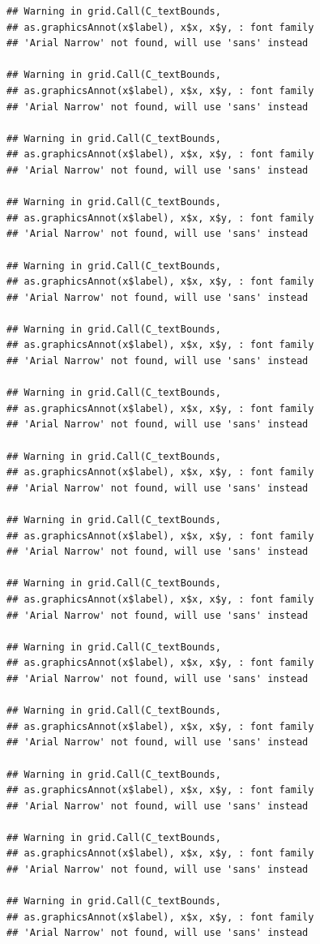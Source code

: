 \documentclass[]{krantz}
\begin{document}
\begin{verbatim}
## Warning in grid.Call(C_textBounds,
## as.graphicsAnnot(x$label), x$x, x$y, : font family
## 'Arial Narrow' not found, will use 'sans' instead

## Warning in grid.Call(C_textBounds,
## as.graphicsAnnot(x$label), x$x, x$y, : font family
## 'Arial Narrow' not found, will use 'sans' instead

## Warning in grid.Call(C_textBounds,
## as.graphicsAnnot(x$label), x$x, x$y, : font family
## 'Arial Narrow' not found, will use 'sans' instead

## Warning in grid.Call(C_textBounds,
## as.graphicsAnnot(x$label), x$x, x$y, : font family
## 'Arial Narrow' not found, will use 'sans' instead

## Warning in grid.Call(C_textBounds,
## as.graphicsAnnot(x$label), x$x, x$y, : font family
## 'Arial Narrow' not found, will use 'sans' instead

## Warning in grid.Call(C_textBounds,
## as.graphicsAnnot(x$label), x$x, x$y, : font family
## 'Arial Narrow' not found, will use 'sans' instead

## Warning in grid.Call(C_textBounds,
## as.graphicsAnnot(x$label), x$x, x$y, : font family
## 'Arial Narrow' not found, will use 'sans' instead

## Warning in grid.Call(C_textBounds,
## as.graphicsAnnot(x$label), x$x, x$y, : font family
## 'Arial Narrow' not found, will use 'sans' instead

## Warning in grid.Call(C_textBounds,
## as.graphicsAnnot(x$label), x$x, x$y, : font family
## 'Arial Narrow' not found, will use 'sans' instead

## Warning in grid.Call(C_textBounds,
## as.graphicsAnnot(x$label), x$x, x$y, : font family
## 'Arial Narrow' not found, will use 'sans' instead

## Warning in grid.Call(C_textBounds,
## as.graphicsAnnot(x$label), x$x, x$y, : font family
## 'Arial Narrow' not found, will use 'sans' instead

## Warning in grid.Call(C_textBounds,
## as.graphicsAnnot(x$label), x$x, x$y, : font family
## 'Arial Narrow' not found, will use 'sans' instead

## Warning in grid.Call(C_textBounds,
## as.graphicsAnnot(x$label), x$x, x$y, : font family
## 'Arial Narrow' not found, will use 'sans' instead

## Warning in grid.Call(C_textBounds,
## as.graphicsAnnot(x$label), x$x, x$y, : font family
## 'Arial Narrow' not found, will use 'sans' instead

## Warning in grid.Call(C_textBounds,
## as.graphicsAnnot(x$label), x$x, x$y, : font family
## 'Arial Narrow' not found, will use 'sans' instead
\end{verbatim}
\end{document}
